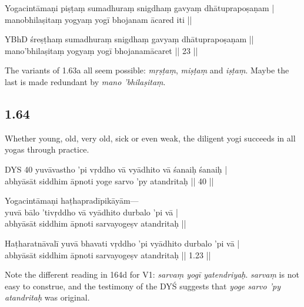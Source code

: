 \begin{ekdosis}
\begin{sources}[hp01_063]
\end{sources}

\begin{testimonia}[hp01_063]
Yogacintāmaṇi
\startverse
piṣṭaṃ sumadhuraṃ snigdhaṃ gavyaṃ dhātuprapoṣaṇam |\\
manobhilaṣitaṃ yogyaṃ yogī bhojanam ācared iti ||
\endverse

YBhD
\startverse
śreṣṭhaṃ sumadhuraṃ snigdhaṃ gavyaṃ dhātuprapoṣaṇam ||\\
mano'bhilaṣitaṃ yogyaṃ yogī bhojanamācaret || 23 ||
\endverse
\end{testimonia}

\begin{philcomm}[hp01_063]
The variants of 1.63a all seem possible: \emph{mṛṣṭaṃ}, \emph{miṣṭaṃ} and \emph{iṣṭaṃ}. Maybe the last is made redundant by \emph{mano 'bhilaṣitaṃ}.
\end{philcomm}

\subsection*{1.64}
\begin{translation}[hp01_064]
Whether young, old, very old, sick or even weak, the diligent yogi succeeds in all yogas through practice.
\end{translation}

\begin{sources}[hp01_064]
DYS 40
\startverse
yuvāvastho 'pi vṛddho vā vyādhito vā śanaiḥ śanaiḥ |\\
abhyāsāt siddhim āpnoti yoge sarvo 'py atandritaḥ || 40 ||
\endverse
\end{sources}

\begin{testimonia}[hp01_064]
Yogacintāmaṇi
\startverse
haṭhapradīpikāyām—\\
yuvā bālo 'tivṛddho vā vyādhito durbalo 'pi vā |\\
abhyāsāt siddhim āpnoti sarvayogeṣv atandritaḥ ||
\endverse

Haṭharatnāvalī
\startverse
yuvā bhavati vṛddho 'pi vyādhito durbalo 'pi vā |\\
abhyāsāt siddhim āpnoti sarvayogeṣv atandritaḥ || 1.23 ||
\endverse
\end{testimonia}

\begin{philcomm}[hp01_064]
Note the different reading in 164d for V1: \emph{sarvaṃ yogī yatendriyaḥ}. \emph{sarvaṃ} is not easy to construe, and the testimony of the DYŚ suggests that \emph{yoge sarvo ’py atandritaḥ} was original.
\end{philcomm}


\end{ekdosis}
